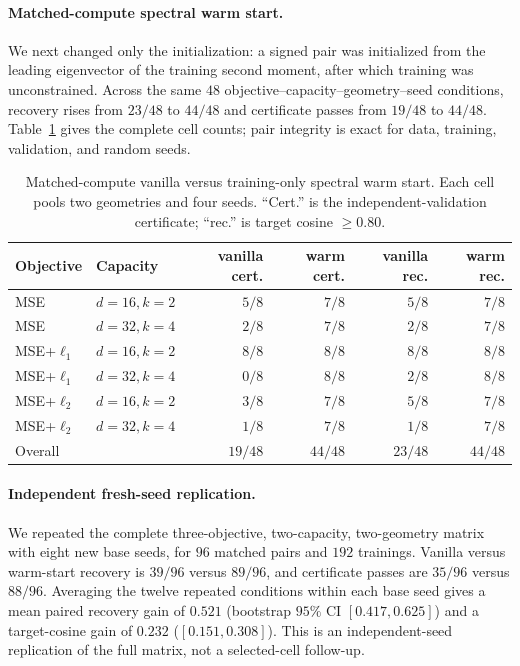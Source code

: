 \documentclass{article}
\theoremstyle{plain}
\begin{document}
{\paragraph{Matched-compute spectral warm start.}\label{app:spectral_warm_start}
We next changed only the initialization: a signed pair was initialized from the leading eigenvector of the training second moment, after which training was unconstrained. Across the same $48$ objective--capacity--geometry--seed conditions, recovery rises from $23/48$ to $44/48$ and certificate passes from $19/48$ to $44/48$. Table~\ref{tab:warmstart} gives the complete cell counts; pair integrity is exact for data, training, validation, and random seeds.

\begin{table}[H]
\caption{Matched-compute vanilla versus training-only spectral warm start. Each cell pools two geometries and four seeds. ``Cert.'' is the independent-validation certificate; ``rec.'' is target cosine $\ge0.80$.}
\label{tab:warmstart}
\begin{center}
\scriptsize
\begin{tabular}{@{}llrrrr@{}}
\toprule
Objective & Capacity & vanilla cert. & warm cert. & vanilla rec. & warm rec. \\
\midrule
MSE & $d{=}16,k{=}2$ & $5/8$ & $7/8$ & $5/8$ & $7/8$ \\
MSE & $d{=}32,k{=}4$ & $2/8$ & $7/8$ & $2/8$ & $7/8$ \\
MSE+$\ell_1$ & $d{=}16,k{=}2$ & $8/8$ & $8/8$ & $8/8$ & $8/8$ \\
MSE+$\ell_1$ & $d{=}32,k{=}4$ & $0/8$ & $8/8$ & $2/8$ & $8/8$ \\
MSE+$\ell_2$ & $d{=}16,k{=}2$ & $3/8$ & $7/8$ & $5/8$ & $7/8$ \\
MSE+$\ell_2$ & $d{=}32,k{=}4$ & $1/8$ & $7/8$ & $1/8$ & $7/8$ \\
\midrule
Overall & & $19/48$ & $44/48$ & $23/48$ & $44/48$ \\
\bottomrule
\end{tabular}
\end{center}
\end{table}

\paragraph{Independent fresh-seed replication.}
We repeated the complete three-objective, two-capacity, two-geometry matrix with eight new base seeds, for $96$ matched pairs and $192$ trainings. Vanilla versus warm-start recovery is $39/96$ versus $89/96$, and certificate passes are $35/96$ versus $88/96$. Averaging the twelve repeated conditions within each base seed gives a mean paired recovery gain of $0.521$ (bootstrap $95\%$ CI $[0.417,0.625]$) and a target-cosine gain of $0.232$ ($[0.151,0.308]$). This is an independent-seed replication of the full matrix, not a selected-cell follow-up.

}
\end{document}
